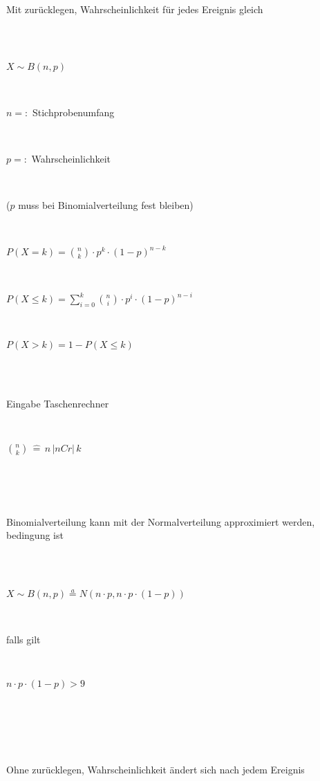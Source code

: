 \documentclass[10pt,a4paper,landscape]{article}
\begin{document}
\begin{multicols*}{4}
\subsection{}
\\ \\
\parbox{\columnwidth}{\centering Mit zurücklegen, Wahrscheinlichkeit für jedes Ereignis gleich }\\ \\
\parbox{\columnwidth}{\centering $X \sim B(n,p)$}\\
\parbox{\columnwidth}{\centering $n =:$ Stichprobenumfang}\\
\parbox{\columnwidth}{\centering $p =:$ Wahrscheinlichkeit}\\
\parbox{\columnwidth}{\centering ($p$ muss bei Binomialverteilung fest bleiben)}\\
\parbox{\columnwidth}{\centering $P(X=k) = \binom{n}{k} \cdot p^k \cdot (1-p)^{n-k}$}\\
\parbox{\columnwidth}{\centering $P(X \leq k) = \sum \limits_{i=0}^k\binom{n}{i} \cdot p^i \cdot (1-p)^{n-i}$}\\
\parbox{\columnwidth}{\centering $P(X > k) = 1 - P(X \leq k)$}\\\\
\parbox{\columnwidth}{\centering Eingabe Taschenrechner}\\
\parbox{\columnwidth}{\centering $\binom{n}{k} \, \widehat{=} \, n \, \vert nCr \vert \, k$}\\ \\ \\
\parbox{\columnwidth}{\centering Binomialverteilung kann mit der Normalverteilung approximiert werden, bedingung ist}\\ \\
\parbox{\columnwidth}{\centering $X \sim B(n, p) \stackrel{a}{=} N(n \cdot p, n \cdot p \cdot (1-p))$}\\
\parbox{\columnwidth}{\centering falls gilt}\\
\parbox{\columnwidth}{\centering $n \cdot p \cdot (1-p) > 9$}\\ \\
\\ \\
\parbox{\columnwidth}{\centering Ohne zurücklegen, Wahrscheinlichkeit ändert sich nach jedem Ereignis}\\ \\

\end{multicols*}
\end{document}
